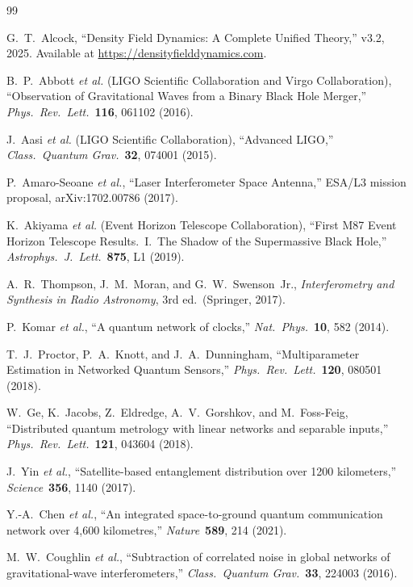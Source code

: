 \documentclass[12pt,a4paper]{article}
\theoremstyle{remark}
\begin{document}
\begin{thebibliography}{99}

G.~T.~Alcock, ``Density Field Dynamics: A Complete Unified Theory,''
v3.2, 2025. Available at \url{https://densityfielddynamics.com}.

B.~P.~Abbott \textit{et al.} (LIGO Scientific Collaboration and Virgo
Collaboration), ``Observation of Gravitational Waves from a Binary Black
Hole Merger,'' \textit{Phys.\ Rev.\ Lett.}\ \textbf{116}, 061102 (2016).

J.~Aasi \textit{et al.} (LIGO Scientific Collaboration), ``Advanced LIGO,''
\textit{Class.\ Quantum Grav.}\ \textbf{32}, 074001 (2015).

P.~Amaro-Seoane \textit{et al.}, ``Laser Interferometer Space Antenna,''
ESA/L3 mission proposal, arXiv:1702.00786 (2017).

K.~Akiyama \textit{et al.} (Event Horizon Telescope Collaboration),
``First M87 Event Horizon Telescope Results.\ I.\ The Shadow of the
Supermassive Black Hole,'' \textit{Astrophys.\ J.\ Lett.}\ \textbf{875},
L1 (2019).

A.~R.~Thompson, J.~M.~Moran, and G.~W.~Swenson~Jr.,
\textit{Interferometry and Synthesis in Radio Astronomy}, 3rd ed.\
(Springer, 2017).

P.~Komar \textit{et al.}, ``A quantum network of clocks,''
\textit{Nat.\ Phys.}\ \textbf{10}, 582 (2014).

T.~J.~Proctor, P.~A.~Knott, and J.~A.~Dunningham, ``Multiparameter
Estimation in Networked Quantum Sensors,''
\textit{Phys.\ Rev.\ Lett.}\ \textbf{120}, 080501 (2018).

W.~Ge, K.~Jacobs, Z.~Eldredge, A.~V.~Gorshkov, and M.~Foss-Feig,
``Distributed quantum metrology with linear networks and separable inputs,''
\textit{Phys.\ Rev.\ Lett.}\ \textbf{121}, 043604 (2018).

J.~Yin \textit{et al.}, ``Satellite-based entanglement distribution over
1200 kilometers,'' \textit{Science}\ \textbf{356}, 1140 (2017).

Y.-A.~Chen \textit{et al.}, ``An integrated space-to-ground quantum
communication network over 4,600 kilometres,''
\textit{Nature}\ \textbf{589}, 214 (2021).

M.~W.~Coughlin \textit{et al.}, ``Subtraction of correlated noise in
global networks of gravitational-wave interferometers,''
\textit{Class.\ Quantum Grav.}\ \textbf{33}, 224003 (2016).


\end{thebibliography}
\end{document}
